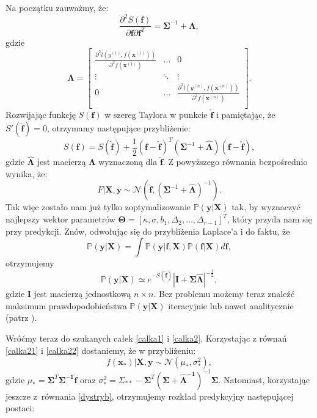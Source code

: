 \documentclass{mini}
\begin{document}
Na początku zauważmy, że:
$$
\frac{\partial^2 S(\mathbf{f})}{\partial \mathbf{f}\partial \mathbf{f}^T} = 
\mathbf{\Sigma}^{-1}+\mathbf{\Lambda},
$$
gdzie
$$
\mathbf{\Lambda} = 
	\left[
        \begin{array}{ccc}
         \frac{\partial^2\textit{l}(y^{(1)}, f(\mathbf{x}^{(1)}))}{\partial^2 f(\mathbf{x}^{(1)})} & \ldots & 0\\
         \vdots & \ddots & \vdots \\
         0 & \ldots & \frac{\partial^2\textit{l}(y^{(n)}, f(\mathbf{x}^{(n)}))}{\partial^2 f(\mathbf{x}^{(n)})} \\
        \end{array}
    \right]. 
$$
Rozwijając funkcję $S(\mathbf{f})$ w szereg Taylora w punkcie $\mathbf{\hat{f}}$ i pamiętając, że $S'(\mathbf{\hat{f}})=0$, otrzymamy następujące przybliżenie:
$$
S(\mathbf{f}) = S(\mathbf{\hat{f}}) + \frac{1}{2}(\mathbf{f} - \mathbf{\hat{f}})^T(\mathbf{\Sigma}^{-1}+\hat{\mathbf{\Lambda}})(\mathbf{f}-\mathbf{\hat{f}}),
$$
gdzie $\hat{\mathbf{\Lambda}}$ jest macierzą $\mathbf{\Lambda}$ wyznaczoną dla $\mathbf{\hat{f}}$. Z powyższego równania bezpośrednio wynika, że:
\begin{equation}\label{calka22}
F | \textbf{X}, \textbf{y} \sim \mathcal{N}\left(  \mathbf{\hat{f}}, (\mathbf{\Sigma}^{-1}+\hat{\mathbf{\Lambda}})^{-1}  \right).
\end{equation}
Tak więc zostało nam już tylko zoptymalizowanie $\mathbb{P}(\mathbf{y} | \textbf{X})$ tak, by wyznaczyć najlepszy wektor parametrów $\mathbf{\Theta} = [\kappa, \sigma, b_1, \Delta_2, \ldots, \Delta_{r-1}]^T$, który przyda nam się przy predykcji. Znów, odwołując się do przybliżenia Laplace'a i do faktu, że
$$
\mathbb{P}(\mathbf{y} | \textbf{X}) = 
\int \mathbb{P}(\mathbf{y}|\mathbf{f}, \textbf{X})\mathbb{P}(\mathbf{f}|\textbf{X}) d\mathbf{f},
$$ 
otrzymujemy
$$
\mathbb{P}(\mathbf{y} | \textbf{X}) \simeq e^{-S(\mathbf{\hat{f}})} \left\vert \mathbf{I} + \mathbf{\Sigma}\mathbf{\hat{\Lambda}} \right\vert^{-\frac{1}{2}},
$$
gdzie $\mathbf{I}$ jest macierzą jednostkową $n\times n$. Bez problemu możemy teraz znaleźć maksimum prawdopodobieństwa $\mathbb{P}(\mathbf{y} | \textbf{X})$ iteracyjnie lub nawet analitycznie (patrz \cite{reg}).  

Wróćmy teraz do szukanych całek \eqref{calka1} i \eqref{calka2}. Korzystając z równań \eqref{calka21} i \eqref{calka22} dostaniemy, że w przybliżeniu:
$$
f(\mathbf{x}_{\ast}) | \textbf{X}, \textbf{y} \sim \mathcal{N}(\mu_{\ast}, \sigma_{\ast}^2),
$$
gdzie $\mu_{\ast} = \mathbf{\Sigma}^T \mathbf{\Sigma^{-1}} \mathbf{\hat{f}}$ oraz $\sigma_{\ast}^2 = \Sigma_{\ast\ast}-\mathbf{\Sigma}^T(\mathbf{\Sigma + \mathbf{\hat{\Lambda}}^{-1}})^{-1}\mathbf{\Sigma}$. Natomiast, korzystając jeszcze z~równania \eqref{dystryb}, otrzymujemy rozkład predykcyjny następującej postaci:
\end{document}
